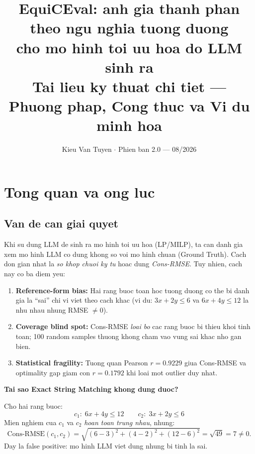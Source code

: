 \documentclass[11pt,a4paper]{article}
\title{\vspace{-1.0cm}
  \textbf{\color{navy}EquiCEval: \DJ{}anh gia thanh phan theo ngu nghia tuong duong\\
  cho mo hinh toi uu hoa do LLM sinh ra}\\[0.4em]
  \large\color{gray6} Tai lieu ky thuat chi tiet ---
  Phuong phap, Cong thuc va Vi du minh hoa
}
\author{\small Kieu Van Tuyen \quad $\cdot$ \quad Phien ban 2.0 --- 08/2026}
\date{}
\begin{document}
\maketitle
\tableofcontents
\newpage

\section{Tong quan va \DJ{}ong luc}

\subsection{Van de can giai quyet}

Khi su dung LLM de sinh ra mo hinh toi uu hoa (LP/MILP), ta can danh gia xem mo hinh
LLM co dung khong so voi mo hinh chuan (Ground Truth). Cach don gian nhat la
\emph{so khop chuoi ky tu} hoac dung \emph{Cons-RMSE}. Tuy nhien, cach nay co ba diem yeu:

\begin{enumerate}
  \item \textbf{Reference-form bias:} Hai rang buoc toan hoc tuong duong co the bi
  danh gia la ``sai'' chi vi viet theo cach khac
  (vi du: $3x+2y\leq6$ va $6x+4y\leq12$ la nhu nhau nhung RMSE $\neq 0$).

  \item \textbf{Coverage blind spot:} Cons-RMSE \emph{loai bo} cac rang buoc bi thieu
  khoi tinh toan; 100 random samples thuong khong cham vao vung sai khac nho gan bien.

  \item \textbf{Statistical fragility:} Tuong quan Pearson $r = 0.9229$ giua
  Cons-RMSE va optimality gap giam con $r = 0.1792$ khi loai mot outlier duy nhat.
\end{enumerate}

\begin{example}
\textbf{Tai sao Exact String Matching khong dung duoc?}

Cho hai rang buoc:
\[
c_1: \; 6x + 4y \leq 12 \qquad c_2: \; 3x + 2y \leq 6
\]
Mien nghiem cua $c_1$ va $c_2$ \emph{hoan toan trung nhau}, nhung:
\[
\text{Cons-RMSE}(c_1, c_2) = \sqrt{(6-3)^2 + (4-2)^2 + (12-6)^2} = \sqrt{49} = 7 \neq 0.
\]
Day la false positive: mo hinh LLM viet dung nhung bi tinh la sai.
\end{example}
\end{document}
